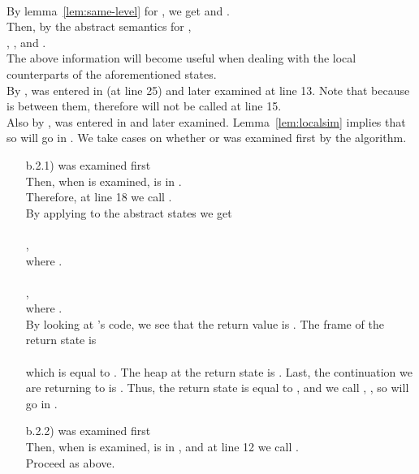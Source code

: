 \documentclass{LMCS}
\theoremstyle{definition} \newtheorem{property}[thm]{Property}
\begin{document}
\begin{enumerate}[]
\begin{enumerate}[]
     \\
    By lemma~\ref{lem:same-level} for , 
    we get  and . \\
    Then, by the abstract semantics for , \\
    , , and 
    . \\
    The above information will become useful when dealing with the local
    counterparts of the aforementioned states. 
    \\
    By \ih{},  was entered in \work{}
    (at line 25) and later examined at line 13.
    Note that  because \astatw{} is between them,
    therefore  will not be called at line 15. 
    \\
    Also by \ih{},  was entered in \work{}
    and later examined.
    Lemma~\ref{lem:localsim} implies that 
     so
     will go in \callers.
    We take cases on whether  or
     was examined first by the algorithm.
    \begin{enumerate}[]
    \item[b.2.1)]
       was examined first \\
      Then, when  is examined, 
       is in \callers. \\
      Therefore, at line 18 we call 
      \tw{)}. \\
      By applying \atol{\cdot} to the abstract states we get \\
       \\
      , \\
      where . \\
       \\
      , \\
      where . \\
      By looking at 's code, we see that the return value is 
      .
      The frame of the return state is \\
       \\
      which is equal to .
      The heap at the return state is \henv.
      Last, the continuation we are returning to is \denot{\clam}.
      Thus, the return state \lstat{} is equal to \atol{\astat},
      and we call \atol{\astato}, \atol{\astat}\tw{)},
      so  will go in \seen.
    \item[b.2.2)]
       was examined first \\
      Then, when  is examined,
       is in \summary{},
      and at line 12 we call 
      \tw{)}. \\
      Proceed as above.
    \end{enumerate}

\end{enumerate}
\end{enumerate}
\end{document}
